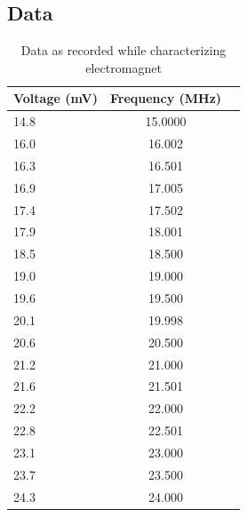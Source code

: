 \documentclass[twocolumn]{article}
\begin{document}
\subsection*{Data}
\begin{table}[h!]
  \begin{center}
    \label{tab:table1}
    \caption{Data as recorded while characterizing electromagnet}
    \begin{tabular}{l c r}
      \textbf{Voltage (mV)} & \textbf{Frequency (MHz)}\\
      \hline
      14.8 & 15.0000\\
      16.0 & 16.002\\
      16.3 & 16.501\\
      16.9 & 17.005\\
      17.4 & 17.502\\
      17.9 & 18.001\\
      18.5 & 18.500\\
      19.0 & 19.000\\
      19.6 & 19.500\\
      20.1 & 19.998\\
      20.6 & 20.500\\
      21.2 & 21.000\\
      21.6 & 21.501\\
      22.2 & 22.000\\
      22.8 & 22.501\\
      23.1 & 23.000\\
      23.7 & 23.500\\
      24.3 & 24.000
    \end{tabular}
  \end{center}
\end{table}
\end{document}
